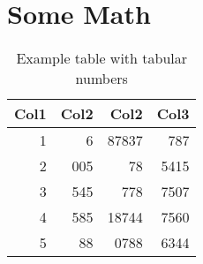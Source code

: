 \documentclass[11pt, a4paper, oneside]{article}
\title{\docsubject}
\author{\docauthor}
\begin{document}
\maketitle

\blinddocument
\clearpage

\section{Some Math}
\blindmathpaper
\begin{table}[t]
    \centering
    \renewcommand{\arraystretch}{1.2}
    \setlength{\tabcolsep}{16pt}
    \caption[Example table]{Example table with tabular numbers}
    \begin{tabular}{rrrr}
        \toprule
        \textbf{Col1} & \textbf{Col2} & \textbf{Col2} & \textbf{Col3} \\
        \midrule
        1             & 6             & 87837         & 787           \\
        2             & 005           & 78            & 5415          \\
        3             & 545           & 778           & 7507          \\
        4             & 585           & 18744         & 7560          \\
        5             & 88            & 0788          & 6344          \\
        \bottomrule
    \end{tabular}
    \label{table:example}
\end{table}
\end{document}
